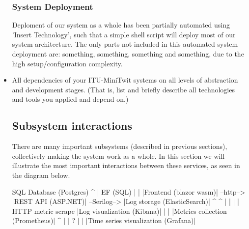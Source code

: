 \begin{itemize}
  \subsubsection{System Deployment}
  Deploment of our system as a whole has been partially automated using 'Insert Technology', such that a simple shell script will deploy most of our system architecture.
  The only parts not included in this automated system deployment are: something, something, something and something, due to the high setup/configuration complexity.

  \item All dependencies of your ITU-MiniTwit systems on all levels of abstraction and development stages. (That is, list and briefly describe all technologies and tools you applied and depend on.)
  \subsection{Subsystem interactions}
  There are many important subsystems (described in previous sections), collectively making the system work as a whole.
  In this section we will illustrate the most important interactions between these services, as seen in the diagram below.\newline

                                         SQL Database (Postgres)
                                              ^
                                              |
                                            EF (SQL)
                                              |
                                              |
  |Frontend (blazor wasm)| --http--> |REST API (ASP.NET)| --Serilog--> |Log storage (ElasticSearch)|
                                              ^                                  ^
                                              |                                  |
                                              |                                  |
                                      HTTP metric scrape             |Log visualization (Kibana)|
                                              |
                                              |
                                |Metrics collection (Prometheus)|
                                              ^
                                              |
                                              |
                                              ?
                                              |
                                              |
                              |Time series visualization (Grafana)|



\end{itemize}
